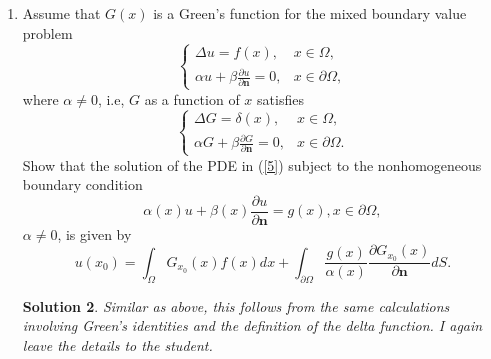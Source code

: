 \documentclass[6pt]{article}
\newtheorem{solution}{Solution}
\numberwithin{equation}{section}
\begin{document}
\begin{enumerate}
(ii).  By using $G(x;x_0)$, find a formula for $u(x_0)$, with $u$ being a solution of
\begin{equation}
\left\{
\begin{array}{ll}
\Delta u=f(x),&x\in \Omega, \\
\frac{\partial u }{\partial \textbf{n}}=g(x),& x\in \partial \Omega.
\end{array}
\right.
\end{equation}
Remark: we know that the problem has a unique solution up to a constant.  You can choose this constant 0 or any number that you like.

\begin{solution}
This follows from straightforward calculations involving Green's identities and the definition of
the delta function. I leave the details to the student.
\end{solution}

\item  Assume that $G(x)$ is a Green's function for the mixed boundary value problem
\begin{equation}\label{5}
\left\{
\begin{array}{ll}
\Delta u=f(x),&x\in \Omega, \\
\alpha u+\beta \frac{\partial u}{\partial \textbf{n}}=0,&x \in \partial \Omega,
\end{array}
\right.
\end{equation}
where $\alpha\neq0$, i.e, $G$ as a function of $x$ satisfies
\begin{equation}
\left\{
\begin{array}{ll}
\Delta G=\delta(x),&x\in \Omega, \\
\alpha G+\beta \frac{\partial G}{\partial \textbf{n}}=0,&x \in \partial \Omega.
\end{array}
\right.
\end{equation}
Show that the solution of the PDE in (\ref{5}) subject to the nonhomogeneous boundary condition
\[\alpha(x) u+\beta(x) \frac{\partial u}{\partial \textbf{n}}=g(x),x \in \partial \Omega,\]
$\alpha\neq 0$,
is given by
\[u(x_0)=\int_\Omega G_{x_0}(x)f(x) dx+\int_{\partial \Omega} \frac{g(x)}{\alpha(x)} \frac{\partial G_{x_0}(x)}{\partial \textbf{n}} dS.\]
\begin{solution}
Similar as above, this follows from the same calculations involving Green's identities and the definition of the delta function. I again leave the details to the student.
\end{solution}
\end{enumerate}
\end{document}
